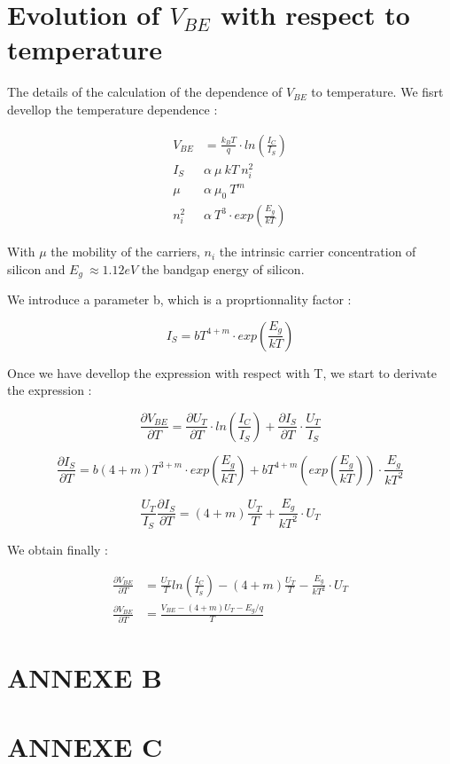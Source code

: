 \chapter{Evolution of $V_{BE}$ with respect to temperature}

The details of the calculation of the dependence of $V_{BE}$ to temperature. We fisrt devellop the temperature dependence : 

\begin{align}
  V_{BE} & = \frac{k_BT}{q} \cdot ln \left( \frac{I_C}{I_S} \right) \\
  I_S ~   & \alpha ~ \mu ~ k T ~ n_i^2 \\
  \mu ~   & \alpha ~ \mu_0 ~ T^m \\
  n_i^2 ~ & \alpha~ T^3  \cdot  exp\left(\frac{E_g}{kT}\right)
\end{align}

With $\mu$ the mobility of the carriers, $n_i$ the intrinsic carrier concentration of silicon and $E_g~\approx 1.12 eV$ the bandgap energy of silicon.

We introduce a parameter b, which is a proprtionnality factor :

\begin{equation}
  I_S = b T^{4+m} \cdot exp\left(\frac{E_g}{kT}\right)
\end{equation}

Once we have devellop the expression with respect with T, we start to derivate the expression : 

\begin{equation}
    \frac{\partial V_{BE}}{\partial T} = \frac{\partial U_{T}}{\partial T}\cdot ln \left( \frac{I_C}{I_S} \right) + \frac{\partial I_{S}}{\partial T} \cdot \frac{U_T}{I_S}
\end{equation}

\begin{equation}
  \frac{\partial I_{S}}{\partial T} = b(4+m)T^{3+m}\cdot exp\left(\frac{E_g}{kT}\right) + bT^{4+m}\left(exp\left(\frac{E_g}{kT}\right)\right)\cdot \frac{E_g}{k T^{2}} 
\end{equation}

  
\begin{equation}
  \frac{U_T}{I_S} \frac{\partial I_{S}}{\partial T} = (4+m)\frac{U_T}{T} + \frac{E_g}{kT^2}\cdot U_T
\end{equation}

We obtain finally :

\begin{align}
  \frac{\partial V_{BE}}{\partial T} & = \frac{U_T}{T} ln \left( \frac{I_C}{I_S} \right) - (4+m)\frac{U_T}{T} - \frac{E_g}{kT^2}\cdot U_T \\
  \frac{\partial V_{BE}}{\partial T} & = \frac{V_{BE} - (4+m)U_T - E_g/q}{T}
\end{align}



\chapter{ ANNEXE B}
\chapter{ ANNEXE C}